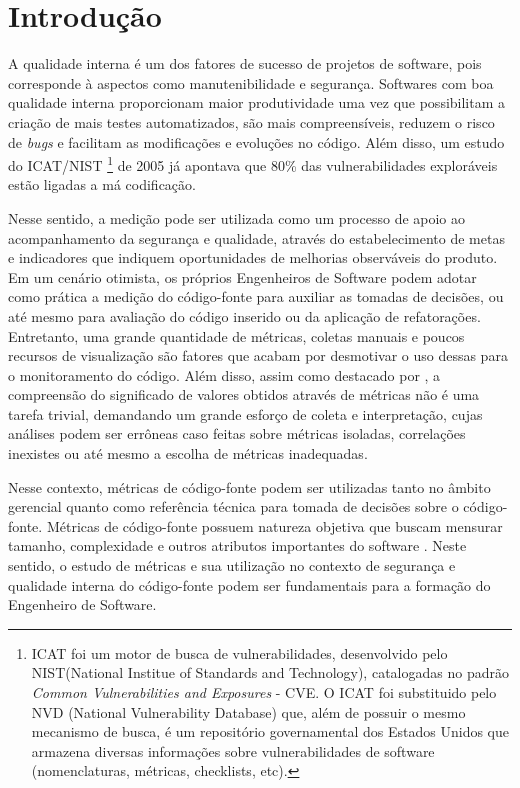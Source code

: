 \section{Introdução}
\label{introduction}

A qualidade interna é um dos fatores de sucesso de projetos de software, pois corresponde à aspectos como manutenibilidade e segurança. Softwares com boa qualidade interna proporcionam maior produtividade uma vez que possibilitam a criação de mais testes automatizados, são mais compreensíveis, reduzem o risco de \emph{bugs} e facilitam as modificações e evoluções no código.
%
Além disso, um estudo do ICAT/NIST
%
\footnote{ICAT foi um motor de busca de vulnerabilidades, desenvolvido pelo NIST(National Institue of Standards and Technology), catalogadas no padrão \emph{Common Vulnerabilities and Exposures} - CVE. O ICAT foi substituido pelo NVD (National Vulnerability Database) que, além de possuir o mesmo mecanismo de busca, é um repositório governamental dos Estados Unidos que armazena diversas informações sobre vulnerabilidades de software (nomenclaturas, métricas, checklists, etc).}
%
de 2005 já apontava que 80\% das vulnerabilidades exploráveis estão ligadas a má codificação.

Nesse sentido, a medição pode ser utilizada como um processo de apoio ao acompanhamento da segurança e qualidade, através do estabelecimento de metas e indicadores que indiquem oportunidades de melhorias observáveis do produto. Em um cenário otimista,
os próprios Engenheiros de Software podem adotar como prática a medição do código-fonte para auxiliar as tomadas de decisões, ou até mesmo para avaliação do código inserido ou da aplicação de refatorações. Entretanto, uma grande quantidade de métricas, coletas manuais e poucos recursos de visualização são fatores que acabam por desmotivar o uso dessas para o monitoramento do código. Além disso, assim como destacado por \cite{chidamber1994}, a compreensão do significado de valores obtidos através de métricas não é uma tarefa trivial, demandando um grande esforço de coleta e interpretação, cujas análises podem ser errôneas caso feitas sobre métricas isoladas, correlações inexistes ou até mesmo a escolha de métricas inadequadas.

Nesse contexto, métricas de código-fonte podem ser utilizadas tanto no âmbito gerencial quanto como referência técnica para tomada de decisões sobre o código-fonte. Métricas de código-fonte possuem natureza objetiva que buscam mensurar tamanho, complexidade e outros atributos importantes do software \cite{henry1984kafura}\cite{troy1981zweben}\cite{yau1985zweben}\cite{systa2000}. Neste sentido, o estudo de métricas e sua utilização no contexto de segurança e qualidade interna do código-fonte podem ser fundamentais para a formação do Engenheiro de Software.

